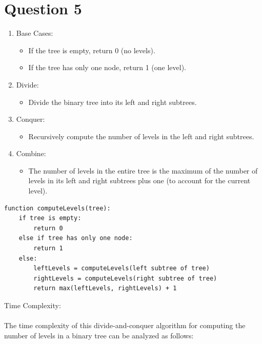 \documentclass{article}
\begin{document}
\section*{Question 5}
\begin{enumerate}
    \item Base Cases:
          \begin{itemize}
              \item If the tree is empty, return 0 (no levels).
              \item If the tree has only one node, return 1 (one level).
          \end{itemize}

    \item Divide:
          \begin{itemize}
              \item Divide the binary tree into its left and right subtrees.
          \end{itemize}

    \item Conquer:
          \begin{itemize}
              \item Recursively compute the number of levels in the left and right subtrees.
          \end{itemize}

    \item Combine:
          \begin{itemize}
              \item The number of levels in the entire tree is the maximum of the number of levels in its left and right subtrees plus one (to account for the current level).
          \end{itemize}
\end{enumerate}

\begin{verbatim}
function computeLevels(tree):
    if tree is empty:
        return 0
    else if tree has only one node:
        return 1
    else:
        leftLevels = computeLevels(left subtree of tree)
        rightLevels = computeLevels(right subtree of tree)
        return max(leftLevels, rightLevels) + 1
\end{verbatim}
Time Complexity:
\\\\The time complexity of this divide-and-conquer algorithm for computing the number of levels in a binary tree can be analyzed as follows:
\end{document}
